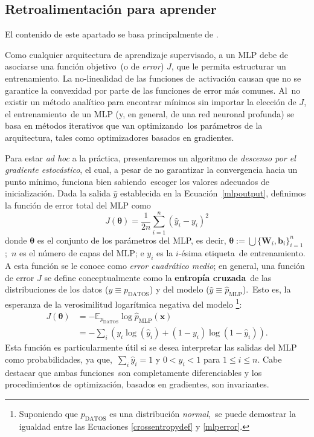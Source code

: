 \subsection{Retroalimentación para aprender}

\noindent
El contenido de este apartado se basa principalmente de \cite{goodfellow-et-al-2016}.\par
Como cualquier arquitectura de aprendizaje supervisado, a un MLP debe de asociarse una función objetivo\
(o de \emph{error}) $J$, que le permita estructurar un entrenamiento. La no-linealidad de las funciones de\
activación causan que no se garantice la convexidad por parte de las funciones de error más comunes. Al\
no existir un método analítico para encontrar mínimos sin importar la elección de $J$, el entrenamiento\
de un MLP (y, en general, de una red neuronal profunda) se basa en métodos iterativos que van optimizando\
los parámetros de la arquitectura, tales como optimizadores basados en gradientes.\par
Para estar \textit{ad hoc} a la práctica, presentaremos un algoritmo de \emph{descenso por el gradiente estocástico},
el cual, a pesar de no garantizar la convergencia hacia un punto mínimo, funciona bien sabiendo\
escoger los valores adecuados de inicialización. Dada la salida $\hat{y}$ establecida en la Ecuación\
\ref{mlpoutput}, definimos la función de error total del MLP como
\begin{equation}
  J(\bm{\theta}) = \frac{1}{2n} \sum_{i=1}^n (\hat{y}_i - y_i)^2 \label{mlperror}
\end{equation}
donde $\bm{\theta}$ es el conjunto de los parámetros del MLP, es decir, $\bm{\theta} := \bigcup\{\bm{W}_i, \bm{b}_i\}_{i=1}^n$;\
$n$ es el número de capas del MLP; e $y_i$ es la $i$-ésima etiqueta\
de entrenamiento. A esta función se le conoce como \emph{error cuadrático medio}; en general,
una función de error $J$ se define conceptualmente como la \textbf{entropía cruzada}\
de las distribuciones de los datos ($y \equiv p_{\text{DATOS}}$) y del modelo ($\hat{y} \equiv \hat{p}_{\text{MLP}}$).\
Esto es, la esperanza de la verosimilitud logarítmica negativa del modelo%
\footnote{
  Suponiendo que $p_{\text{DATOS}}$ es una distribución \emph{normal},\
  se puede demostrar la igualdad entre las Ecuaciones \ref{crossentropydef} y \ref{mlperror}.
 }:
\begin{align}
  J(\bm{\theta}) &=  - \mathbb{E}_{p_{\text{DATOS}}} \log\hat{p}_{\text{MLP}}(\bm{x}) \label{crossentropydef}\\
  &= - \sum_i (y_i\log(\hat{y}_i) + (1 - y_i)\log(1 - \hat{y}_i)). \label{crossentropy}
\end{align}
Esta función es particularmente útil si se desea interpretar las salidas del MLP como probabilidades, ya que,\
$\sum_i \hat{y}_i = 1$ y $0 < \hat{y}_i < 1 $ para $1 \leq i \leq n$. Cabe destacar que ambas funciones\
son completamente diferenciables y los procedimientos de optimización, basados en gradientes, son invariantes.

